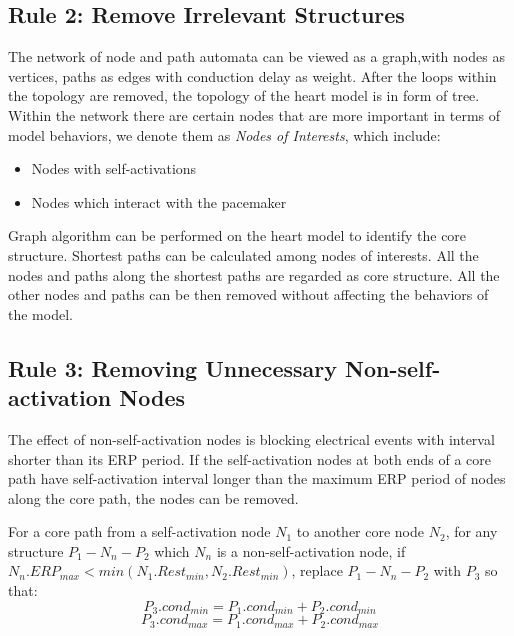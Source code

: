 \subsection{Rule 2: Remove Irrelevant Structures}
The network of node and path automata can be viewed as a graph,with nodes as vertices, paths as edges with conduction delay as weight. After the loops within the topology are removed, the topology of the heart model is in form of tree. Within the network there are certain nodes that are more important in terms of model behaviors, we denote them as \emph{Nodes of Interests}, which include:
\begin{itemize}
	\item Nodes with self-activations
	\item Nodes which interact with the pacemaker
\end{itemize}
Graph algorithm can be performed on the heart model to identify the core structure. Shortest paths can be calculated among nodes of interests. All the nodes and paths along the shortest paths are regarded as core structure. All the other nodes and paths can be then removed without affecting the behaviors of the model. 

\subsection{Rule 3: Removing Unnecessary Non-self-activation Nodes}
The effect of non-self-activation nodes is blocking electrical events with interval shorter than its ERP period. If the self-activation nodes at both ends of a core path have self-activation interval longer than the maximum ERP period of nodes along the core path, the nodes can be removed.

For a core path from a self-activation node $N_1$ to another core node $N_2$, for any structure $P_1-N_n-P_2$ which $N_n$ is a non-self-activation node, if $N_n.ERP_{max}<min(N_1.Rest_{min},N_2.Rest_{min})$, replace $P_1-N_n-P_2$ with $P_3$ so that:
$$P_3.cond_{min}=P_1.cond_{min}+P_2.cond_{min}$$
$$P_3.cond_{max}=P_1.cond_{max}+P_2.cond_{max}$$
